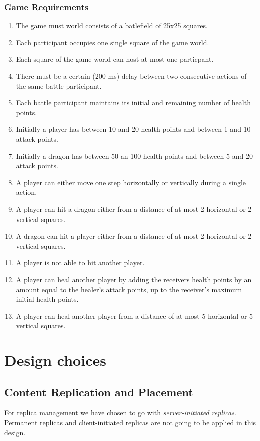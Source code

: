 \documentclass{article}
\begin{document}
\subsubsection{Game Requirements}
\begin{enumerate}
	\item The game must world consists of a batlefield of 25x25 squares.
	\item Each participant occupies one single  square of the game world.
	\item Each square of the game world can host at most one particpant.
	\item There must be a certain (200 ms) delay between two consecutive actions of the same battle participant.
	\item Each battle participant maintains its initial and remaining number of health points.
	\item Initially a player has between 10 and 20 health points and between 1 and 10 attack points.
	\item Initially a dragon has between 50 an 100 health points and between 5 and 20 attack points.
	\item A player can either move one step horizontally or vertically during a single action.
	\item A player can hit a dragon either from a distance of at most 2 horizontal or 2 vertical squares.
	\item A dragon can hit a player either from a distance of at most 2 horizontal or 2 vertical squares.
	\item A player is not able to hit another player.
	\item A player can heal another player by adding the receivers health points by an amount equal to the healer's attack points, up to the receiver's maximum initial health points. 
	\item A player can heal another player from a distance of at most 5 horizontal or 5 vertical squares.
\end{enumerate}

\section{Design choices}
\subsection{Content Replication and Placement}
For replica management we have chosen to go with \emph{server-initiated replicas}. Permanent replicas and client-initiated replicas are not going to be applied in this design. 
\end{document}
